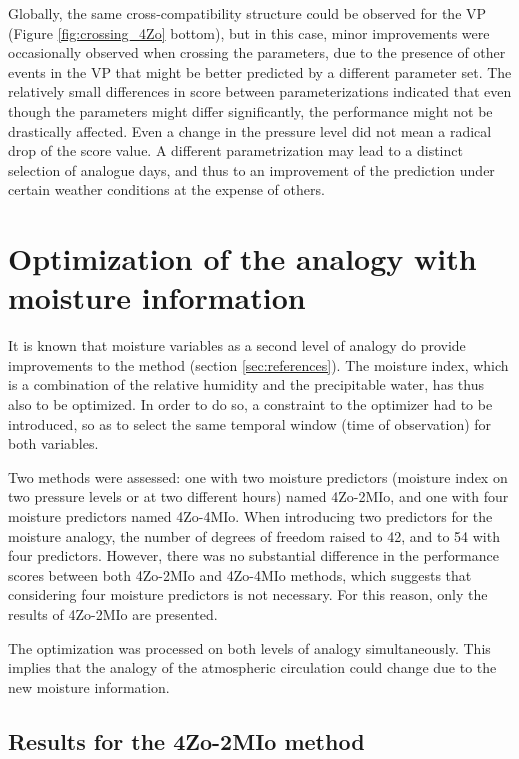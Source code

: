 \documentclass[review]{elsarticle}
\begin{document}
Globally, the same cross-compatibility structure could be observed for the VP (Figure \ref{fig:crossing_4Zo} bottom), but in this case, minor improvements were occasionally observed when crossing the parameters, due to the presence of other events in the VP that might be better predicted by a different parameter set. The relatively small differences in score between parameterizations indicated that even though the parameters might differ significantly, the performance might not be drastically affected. Even a change in the pressure level did not mean a radical drop of the score value. A different parametrization may lead to a distinct selection of analogue days, and thus to an improvement of the prediction under certain weather conditions at the expense of others.


\section{Optimization of the analogy with moisture information}
\label{sec:optim_moisture}

It is known that moisture variables as a second level of analogy do provide improvements to the method (section \ref{sec:references}). The moisture index, which is a combination of the relative humidity and the precipitable water, has thus also to be optimized. In order to do so, a constraint to the optimizer had to be introduced, so as to select the same temporal window (time of observation) for both variables. 

Two methods were assessed: one with two moisture predictors (moisture index on two pressure levels or at two different hours) named 4Zo-2MIo, and one with four moisture predictors named 4Zo-4MIo. When introducing two predictors for the moisture analogy, the number of degrees of freedom raised to 42, and to 54 with four predictors. However, there was no substantial difference in the performance scores between both 4Zo-2MIo and 4Zo-4MIo methods, which suggests that considering four moisture predictors is not necessary. For this reason, only the results of 4Zo-2MIo are presented.

The optimization was processed on both levels of analogy simultaneously. This implies that the analogy of the atmospheric circulation could change due to the new moisture information.


\subsection{Results for the 4Zo-2MIo method}
\end{document}
